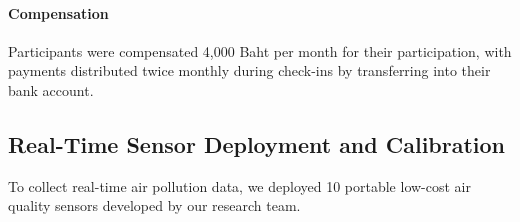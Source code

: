 

\paragraph{Compensation}
Participants were compensated 4,000 Baht per month for their participation, with payments distributed twice monthly during check-ins by transferring into their bank account.

\subsection{Real-Time Sensor Deployment and Calibration}

To collect real-time air pollution data, we deployed 10 portable low-cost air quality sensors developed by our research team.


